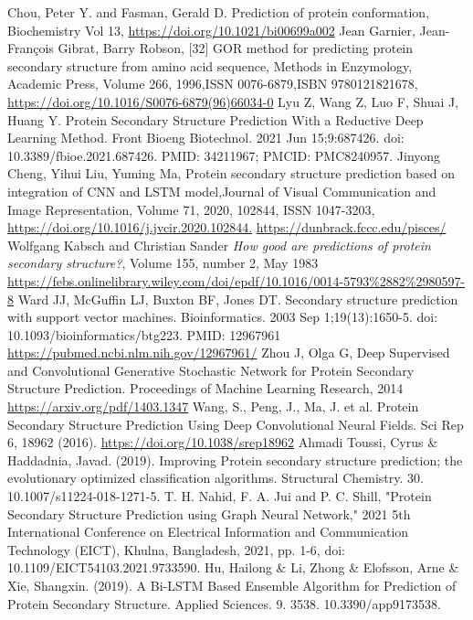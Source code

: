 \documentclass[conference]{IEEEtran}
\begin{document}
\begin{thebibliography}{00}
 Chou, Peter Y. and Fasman, Gerald D. Prediction of protein conformation, Biochemistry Vol 13, \url{https://doi.org/10.1021/bi00699a002}
Jean Garnier, Jean-François Gibrat, Barry Robson,
[32] GOR method for predicting protein secondary structure from amino acid sequence, Methods in Enzymology, Academic Press, Volume 266, 1996,ISSN 0076-6879,ISBN 9780121821678,
\url{https://doi.org/10.1016/S0076-6879(96)66034-0}
 Lyu Z, Wang Z, Luo F, Shuai J, Huang Y. Protein Secondary Structure Prediction With a Reductive Deep Learning Method. Front Bioeng Biotechnol. 2021 Jun 15;9:687426. doi: 10.3389/fbioe.2021.687426. PMID: 34211967; PMCID: PMC8240957.
 Jinyong Cheng, Yihui Liu, Yuming Ma,
Protein secondary structure prediction based on integration of CNN and LSTM model,Journal of Visual Communication and Image Representation, Volume 71, 2020, 102844, ISSN 1047-3203,
\url{https://doi.org/10.1016/j.jvcir.2020.102844.}
\url{https://dunbrack.fccc.edu/pisces/}
 Wolfgang Kabsch and Christian Sander {\it How good are predictions of protein secondary structure?}, Volume 155, number 2, May 1983 \url{https://febs.onlinelibrary.wiley.com/doi/epdf/10.1016/0014-5793%2882%2980597-8}
 Ward JJ, McGuffin LJ, Buxton BF, Jones DT. Secondary structure prediction with support vector machines. Bioinformatics. 2003 Sep 1;19(13):1650-5. doi: 10.1093/bioinformatics/btg223. PMID: 12967961 \url{https://pubmed.ncbi.nlm.nih.gov/12967961/}
 Zhou J, Olga G, Deep Supervised and Convolutional Generative Stochastic Network for Protein Secondary Structure Prediction. Proceedings of Machine Learning Research, 2014 \url{https://arxiv.org/pdf/1403.1347}
 Wang, S., Peng, J., Ma, J. et al. Protein Secondary Structure Prediction Using Deep Convolutional Neural Fields. Sci Rep 6, 18962 (2016). \url{https://doi.org/10.1038/srep18962}
 Ahmadi Toussi, Cyrus \& Haddadnia, Javad. (2019). Improving Protein secondary structure prediction; the evolutionary optimized classification algorithms. Structural Chemistry. 30. 10.1007/s11224-018-1271-5. 
 T. H. Nahid, F. A. Jui and P. C. Shill, "Protein Secondary Structure Prediction using Graph Neural Network," 2021 5th International Conference on Electrical Information and Communication Technology (EICT), Khulna, Bangladesh, 2021, pp. 1-6, doi: 10.1109/EICT54103.2021.9733590.
Hu, Hailong \& Li, Zhong \& Elofsson, Arne \& Xie, Shangxin. (2019). A Bi-LSTM Based Ensemble Algorithm for Prediction of Protein Secondary Structure. Applied Sciences. 9. 3538. 10.3390/app9173538. 

\end{thebibliography}
\end{document}
